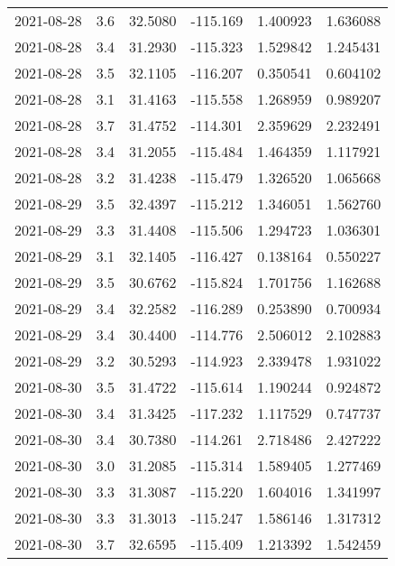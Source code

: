 \begin{tabular}{lrrrrr}
2021-08-28 &       3.6 &  32.5080 &  -115.169 &         1.400923 &         1.636088 \\
2021-08-28 &       3.4 &  31.2930 &  -115.323 &         1.529842 &         1.245431 \\
2021-08-28 &       3.5 &  32.1105 &  -116.207 &         0.350541 &         0.604102 \\
2021-08-28 &       3.1 &  31.4163 &  -115.558 &         1.268959 &         0.989207 \\
2021-08-28 &       3.7 &  31.4752 &  -114.301 &         2.359629 &         2.232491 \\
2021-08-28 &       3.4 &  31.2055 &  -115.484 &         1.464359 &         1.117921 \\
2021-08-28 &       3.2 &  31.4238 &  -115.479 &         1.326520 &         1.065668 \\
2021-08-29 &       3.5 &  32.4397 &  -115.212 &         1.346051 &         1.562760 \\
2021-08-29 &       3.3 &  31.4408 &  -115.506 &         1.294723 &         1.036301 \\
2021-08-29 &       3.1 &  32.1405 &  -116.427 &         0.138164 &         0.550227 \\
2021-08-29 &       3.5 &  30.6762 &  -115.824 &         1.701756 &         1.162688 \\
2021-08-29 &       3.4 &  32.2582 &  -116.289 &         0.253890 &         0.700934 \\
2021-08-29 &       3.4 &  30.4400 &  -114.776 &         2.506012 &         2.102883 \\
2021-08-29 &       3.2 &  30.5293 &  -114.923 &         2.339478 &         1.931022 \\
2021-08-30 &       3.5 &  31.4722 &  -115.614 &         1.190244 &         0.924872 \\
2021-08-30 &       3.4 &  31.3425 &  -117.232 &         1.117529 &         0.747737 \\
2021-08-30 &       3.4 &  30.7380 &  -114.261 &         2.718486 &         2.427222 \\
2021-08-30 &       3.0 &  31.2085 &  -115.314 &         1.589405 &         1.277469 \\
2021-08-30 &       3.3 &  31.3087 &  -115.220 &         1.604016 &         1.341997 \\
2021-08-30 &       3.3 &  31.3013 &  -115.247 &         1.586146 &         1.317312 \\
2021-08-30 &       3.7 &  32.6595 &  -115.409 &         1.213392 &         1.542459 \\

\end{tabular}

